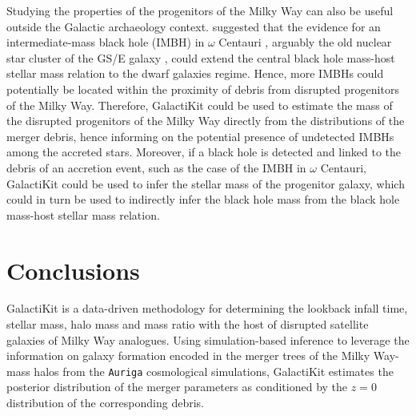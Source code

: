 Studying the properties of the progenitors of the Milky Way can also be useful outside the Galactic archaeology context. \cite{Limberg2024} suggested that the evidence for an intermediate-mass black hole (IMBH) in $\omega$ Centauri \citep{Haberle2024}, arguably the old nuclear star cluster of the GS/E galaxy \citep{Limberg2022}, could extend the central black hole mass-host stellar mass relation \citep{Greene2020} to the dwarf galaxies regime. Hence, more IMBHs could potentially be located within the proximity of debris from disrupted progenitors of the Milky Way. Therefore, GalactiKit could be used to estimate the mass of the disrupted progenitors of the Milky Way directly from the distributions of the merger debris, hence informing on the potential presence of undetected IMBHs among the accreted stars. Moreover, if a black hole is detected and linked to the debris of an accretion event, such as the case of the IMBH in $\omega$ Centauri, GalactiKit could be used to infer the stellar mass of the progenitor galaxy, which could in turn be used to indirectly infer the black hole mass from the black hole mass-host stellar mass relation. 














\section{Conclusions}
\label{sec:conclusions}

GalactiKit is a data-driven methodology for determining the lookback infall time, stellar mass, halo mass and mass ratio with the host of disrupted satellite galaxies of Milky Way analogues. Using simulation-based inference to leverage the information on galaxy formation encoded in the merger trees of the Milky Way-mass halos from the \texttt{Auriga} cosmological simulations, GalactiKit estimates the posterior distribution of the merger parameters as conditioned by the $z=0$ distribution of the corresponding debris.   

